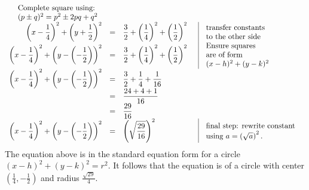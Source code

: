 {\[\begin{array}{rcll|l}
\begin{array}{l}
\text{Complete square using: } \\
(p\pm  q)^2=p^2\pm 2pq+q^2
\end{array}\\
\displaystyle \left(x-\frac{1}{4}\right)^2 +\left(y+\frac{1}{2}\right)^2&=&\displaystyle \frac{3}{2}+\left(\frac{1}{4}\right)^2+\left(\frac{1}{2}\right)^2 && \renewcommand{\arraystretch}{1} \begin{array}{l}\text{transfer constants}\\ \text{to the other side}\end{array}\\
\displaystyle \left(x-\frac{1}{4}\right)^2 +\left(y-\left( -\frac{1}{2}\right)\right)^2&=&\displaystyle  \frac{3}{2}+\left(\frac{1}{4}\right)^2+\left(\frac{1}{2}\right)^2&& \renewcommand{\arraystretch}{1} 
\begin{array}{l}
\text{Ensure squares} \\ 
\text{are of form}\\
(x-h)^2+(y-k)^2
\end{array}\\
\displaystyle \left(x-\frac{1}{4}\right)^2 +\left(y-\left(-\frac{1}{2}\right)\right)^2 &=&\displaystyle \frac{3}{2}+\frac{1}{4}+\frac{1}{16}\\
&=&\displaystyle  \frac{24+4+1}{16}\\
&=&\displaystyle  \frac{29}{16}\\
\displaystyle \left(x-\frac{1}{4}\right)^2 +\left(y-\left(-\frac{1}{2} \right)\right)^2 &=&\displaystyle \left(\sqrt{\frac{29}{16}}\right)^2 && \renewcommand{\arraystretch}{1}\begin{array}{l} 
\text{final step: rewrite constant }\\
\text{using } a=\left(\sqrt{a}\right)^2.
\end{array}
\end{array}
\]
The equation above is in the standard equation form for a circle $(x-h)^2+(y-k)^2=r^2$. It follows that the equation is of a circle with center $\left(\frac{1}{4},-\frac{1}{2} \right)$ and radius $\frac{\sqrt{29}}{4}$.

}
